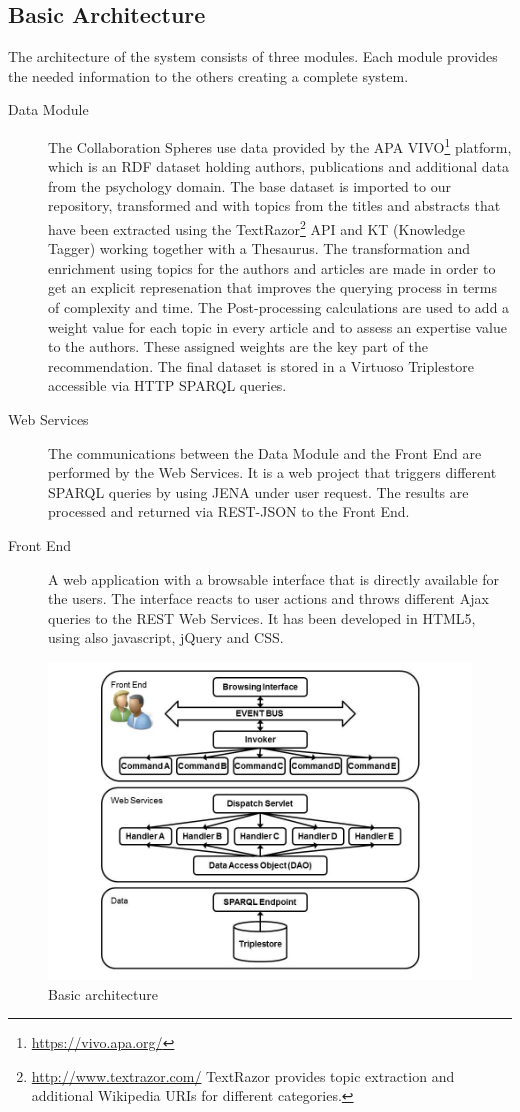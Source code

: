 \subsection{Basic Architecture}
The architecture of the system consists of three modules. Each module provides
the needed information to the others creating a complete system.
\begin{description}
\item[Data Module]The Collaboration Spheres use data provided by the APA VIVO\footnote{\url{https://vivo.apa.org/}} platform, which is an RDF dataset holding authors, publications and additional data from the psychology domain. The base dataset is imported to our repository, transformed and with topics from the titles and abstracts that have been extracted using the TextRazor\footnote{\url{http://www.textrazor.com/} TextRazor provides topic extraction and additional Wikipedia URIs for different categories.} API and KT (Knowledge Tagger) working together with a Thesaurus. The transformation and enrichment using topics for the authors and articles are made in order to get an explicit represenation that improves the querying process in terms of complexity and time. The Post-processing calculations are used to add a weight value for each topic in every article and to assess an expertise value to the authors. These assigned weights are the key part of the recommendation. The final dataset is stored in a Virtuoso Triplestore accessible via HTTP SPARQL queries.
\item[Web Services]The communications between the Data Module and the Front End are performed by the Web Services. It is a web project that triggers different SPARQL queries by using JENA under user request. The results are processed and returned via REST-JSON to the Front End.
\item[Front End]A web application with a browsable interface that is directly available for the users. The interface reacts to user actions and throws different Ajax queries to the REST Web Services. It has been developed in HTML5, using also javascript, jQuery and CSS. 
\end{description}
\begin{figure}[!hbt]
\centering
\includegraphics[scale=0.3]{img/APAarchitecture.jpg}
\caption{Basic architecture}
\label{fig:arch}
\end{figure}
